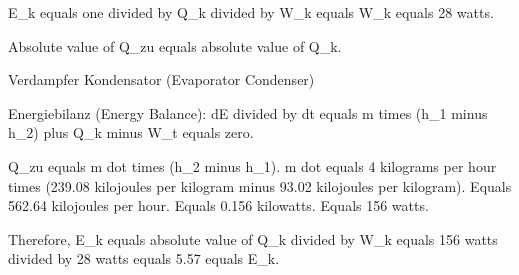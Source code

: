 E_k equals one divided by Q_k divided by W_k equals W_k equals 28 watts.  

Absolute value of Q_zu equals absolute value of Q_k.  

Verdampfer Kondensator (Evaporator Condenser)  

Energiebilanz (Energy Balance):  
dE divided by dt equals m times (h_1 minus h_2) plus Q_k minus W_t equals zero.  

Q_zu equals m dot times (h_2 minus h_1).  
m dot equals 4 kilograms per hour times (239.08 kilojoules per kilogram minus 93.02 kilojoules per kilogram).  
Equals 562.64 kilojoules per hour.  
Equals 0.156 kilowatts.  
Equals 156 watts.  

Therefore, E_k equals absolute value of Q_k divided by W_k equals 156 watts divided by 28 watts equals 5.57 equals E_k.
